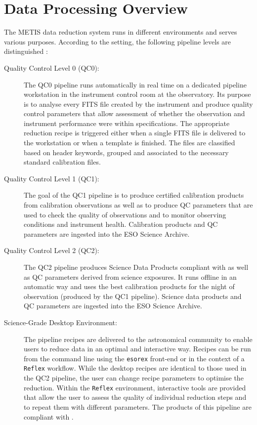 \section{Data Processing Overview}
\label{sec:data_processing_overview}

The METIS data reduction system runs in different environments and
serves various purposes.  According to the setting, the following
pipeline levels are distinguished \cite{1618}:

\begin{description}
\item[Quality Control Level 0 (QC0):] The QC0 pipeline runs
  automatically in real time on a dedicated pipeline workstation in
  the instrument control room at the observatory. Its purpose is to
  analyse every FITS file created by the instrument and produce
  quality control parameters that allow assessment of whether the
  observation and instrument performance were within specifications.
  The appropriate reduction recipe is triggered either when a single
  FITS file is delivered to the workstation or when a template is
  finished. The files are classified based on header keywords, grouped
  and associated to the necessary standard calibration files.

\item[Quality Control Level 1 (QC1):] The goal of the QC1 pipeline is
  to produce certified calibration products from calibration
  observations as well as to produce QC parameters that are used to
  check the quality of observations and to monitor observing
  conditions and instrument health. Calibration products and QC
  parameters are ingested into the ESO Science Archive.

\item[Quality Control Level 2 (QC2):] The QC2 pipeline produces
  Science Data Products compliant with \cite{ESO-products_standard} as
  well as QC parameters derived from science exposures. It runs
  offline in an automatic way and uses the best calibration products
  for the night of observation (produced by the QC1 pipeline). Science
  data products and QC parameters are ingested into the ESO Science
  Archive.

\item[Science-Grade Desktop Environment:] The pipeline recipes are
  delivered to the astronomical community to enable users to reduce
  data in an optimal and interactive way. Recipes can be run from the
  command line using the \lstinline{esorex} front-end or in the
  context of a \lstinline{Reflex} workflow. While the desktop recipes
  are identical to those used in the QC2 pipeline, the user can change
  recipe parameters to optimise the reduction. Within the
  \lstinline{Reflex} environment, interactive tools are provided that
  allow the user to assess the quality of individual reduction steps
  and to repeat them with different parameters. The products of this
  pipeline are compliant with \cite{ESO-products_standard}.

\end{description}


